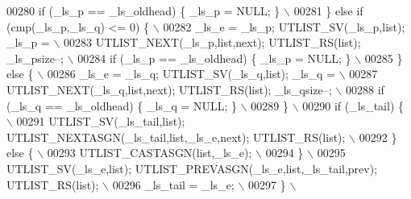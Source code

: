 \begin{DoxyCode}
00280 \textcolor{preprocessor}{            if (\_ls\_p == \_ls\_oldhead) \{ \_ls\_p = NULL; \}                                        \(\backslash\)}
00281 \textcolor{preprocessor}{          \} else if (cmp(\_ls\_p,\_ls\_q) <= 0) \{                                                  \(\backslash\)}
00282 \textcolor{preprocessor}{            \_ls\_e = \_ls\_p; UTLIST\_SV(\_ls\_p,list); \_ls\_p =                                      \(\backslash\)}
00283 \textcolor{preprocessor}{              UTLIST\_NEXT(\_ls\_p,list,next); UTLIST\_RS(list); \_ls\_psize--;                      \(\backslash\)}
00284 \textcolor{preprocessor}{            if (\_ls\_p == \_ls\_oldhead) \{ \_ls\_p = NULL; \}                                        \(\backslash\)}
00285 \textcolor{preprocessor}{          \} else \{                                                                             \(\backslash\)}
00286 \textcolor{preprocessor}{            \_ls\_e = \_ls\_q; UTLIST\_SV(\_ls\_q,list); \_ls\_q =                                      \(\backslash\)}
00287 \textcolor{preprocessor}{              UTLIST\_NEXT(\_ls\_q,list,next); UTLIST\_RS(list); \_ls\_qsize--;                      \(\backslash\)}
00288 \textcolor{preprocessor}{            if (\_ls\_q == \_ls\_oldhead) \{ \_ls\_q = NULL; \}                                        \(\backslash\)}
00289 \textcolor{preprocessor}{          \}                                                                                    \(\backslash\)}
00290 \textcolor{preprocessor}{          if (\_ls\_tail) \{                                                                      \(\backslash\)}
00291 \textcolor{preprocessor}{            UTLIST\_SV(\_ls\_tail,list); UTLIST\_NEXTASGN(\_ls\_tail,list,\_ls\_e,next); UTLIST\_RS(list); \(\backslash\)}
00292 \textcolor{preprocessor}{          \} else \{                                                                             \(\backslash\)}
00293 \textcolor{preprocessor}{            UTLIST\_CASTASGN(list,\_ls\_e);                                                       \(\backslash\)}
00294 \textcolor{preprocessor}{          \}                                                                                    \(\backslash\)}
00295 \textcolor{preprocessor}{          UTLIST\_SV(\_ls\_e,list); UTLIST\_PREVASGN(\_ls\_e,list,\_ls\_tail,prev); UTLIST\_RS(list);   \(\backslash\)}
00296 \textcolor{preprocessor}{          \_ls\_tail = \_ls\_e;                                                                    \(\backslash\)}
00297 \textcolor{preprocessor}{        \}                                                                                      \(\backslash\)}

\end{DoxyCode}
